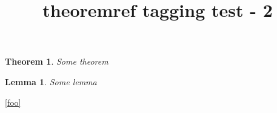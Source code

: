 \documentclass{article}
\title{theoremref tagging test - 2}
\newtheorem{theorem}{Theorem}
\newtheorem{lemma}{Lemma}
\begin{document}
\begin{theorem}
Some theorem
\end{theorem}
\begin{lemma}
Some lemma
\end{lemma}

\ref{foo}


\end{document}
